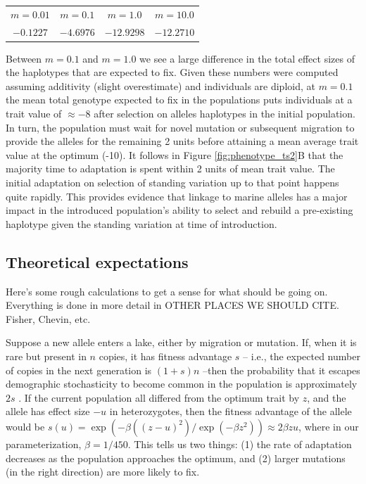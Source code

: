 \documentclass{article}
\newcommand{\plr}[1]{\todo[linecolor=blue,backgroundcolor=blue!25,bordercolor=blue]{#1}}
\begin{document}
\begin{center}
\begin{tabular}{ | c | c  | c  | c | }
 \hline
 $m = 0.01$ & $m = 0.1$ & $m = 1.0$ & $m = 10.0$ \\ 
 $-0.1227$ &  $-4.6976$ & $-12.9298$  & $-12.2710$\\
 \hline
\end{tabular}
\end{center}

Between $m = 0.1$ and $m = 1.0$ we see a large difference in the total effect sizes of the haplotypes that are expected to fix.
Given these numbers were computed assuming additivity (slight overestimate) and individuals are diploid,
at $m = 0.1$ the mean total genotype expected to fix in the populations puts individuals at a trait value of $\approx -8$ 
after selection on alleles haplotypes in the initial population. 
In turn, the population must wait for novel mutation or subsequent migration to provide the alleles for the remaining 2 units before 
attaining a mean average trait value at the optimum (-10).
It follows in Figure \ref{fig:phenotype_ts2}B that the majority time to adaptation is spent within 2 units of mean trait value.
The initial adaptation on selection of standing variation up to that point happens quite rapidly.
This provides evidence that linkage to marine alleles has a major impact in the introduced population's ability 
to select and rebuild a pre-existing haplotype given the standing variation at time of introduction. 

\subsection*{Theoretical expectations}
\plr{does this go first or second?}

Here's some rough calculations to get a sense for what should be going on. Everything is done in more detail in OTHER PLACES WE SHOULD CITE.
Fisher, Chevin, etc.

Suppose a new allele enters a lake, either by migration or mutation. If, when it is rare but present in $n$ copies, it has fitness advantage $s$ -- i.e., the expected number of copies in the next generation is $(1+s)n$ --then the probability that it escapes demographic stochasticity to become common in the population is approximately $2s$ \citep{fisher,prob_fixation}. If the current population all differed from the optimum trait by $z$, and the allele has effect size $-u$ in heterozygotes, then the fitness advantage of the allele would be $s(u) = \exp(-\beta((z - u)^2) / \exp( - \beta z^2)) \approx 2 \beta z u$, where in our parameterization, $\beta = 1 / 450$. This tells us two things: (1) the rate of adaptation decreases as the population approaches the optimum, and (2) larger mutations (in the right direction) are more likely to fix.
\end{document}
